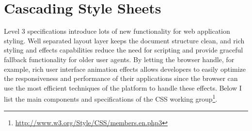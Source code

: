 \section{Cascading Style Sheets}
\label{section:css}

 Level 3 specifications introduce lots of new functionality
for web application styling. Well separated layout layer keeps the
document structure clean, and rich styling and effects capabilities
reduce the need for scripting and provide graceful fallback
functionality for older user agents. By letting the browser handle,
for example, rich user interface animation effects allows developers
to easily optimize the responsiveness and performance of their
applications since the browser can use the most efficient techniques
of the platform to handle these effects. Below I list the main
components and specifications of the  CSS working
group\footnote{\url{http://www.w3.org/Style/CSS/members.en.php3}}.

